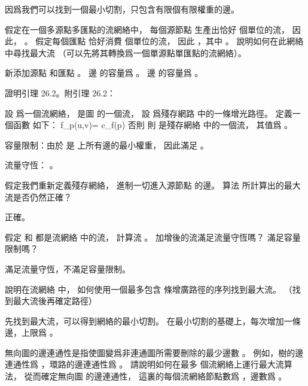 \startANSWER
因爲我們可以找到一個最小切割，只包含有限個有限權重的邊。
\stopANSWER

\startEXERCISE
假定在一個多源點多匯點的流網絡中，
每個源節點  生產出恰好  個單位的流，
因此， 。
假定每個匯點  恰好消費  個單位的流，
因此 ，其中 。
說明如何在此網絡中尋找最大流  （可以先將其轉換爲一個單源點單匯點的流網絡）。
\stopEXERCISE

\startANSWER
新添加源點  和匯點 。
邊  的容量爲 。
邊  的容量爲 。
\stopANSWER

\startEXERCISE
證明引理 26.2。附引理 26.2：

設  爲一個流網絡，
  是圖  的一個流，
設  爲殘存網路  中的一條增光路徑。
定義一個函數  如下：
\startformula
f_p(u,v)=\startcases
\NC c_f(p) \MC {} \NR
{} \MC 否則 \NR
\stopcases
\stopformula
則  是殘存網絡  中的一個流，
其值爲 。
\stopEXERCISE

\startANSWER
容量限制：由於  是  上所有邊的最小權重，
因此滿足 。

流量守恆： 。
\stopANSWER

\startEXERCISE
假定我們重新定義殘存網絡，
進制一切進入源節點  的邊。
算法  所計算出的最大流是否仍然正確？
\stopEXERCISE

\startANSWER
正確。
\stopANSWER

\startEXERCISE
假定  和  都是流網絡  中的流，
計算流 。
加增後的流滿足流量守恆嗎？
滿足容量限制嗎？
\stopEXERCISE

\startANSWER
滿足流量守恆，不滿足容量限制。
\stopANSWER

\startEXERCISE
說明在流網絡  中，
如何使用一個最多包含  條增廣路徑的序列找到最大流。
（\hint 找到最大流後再確定路徑）
\stopEXERCISE

\startANSWER
先找到最大流，可以得到網絡的最小切割。
在最小切割的基礎上，每次增加一條邊，上限爲 。
\stopANSWER

\startEXERCISE
無向圖的{\EMP 邊連通性}是指使圖變爲非連通圖所需要刪除的最少邊數 。
例如，樹的邊連通性爲 ，環路的邊連通性爲 。
請說明如何在最多  個流網絡上運行最大流算法，
從而確定無向圖  的邊連通性，
這裏的每個流網絡節點數爲 ，邊數爲 。
\stopEXERCISE

